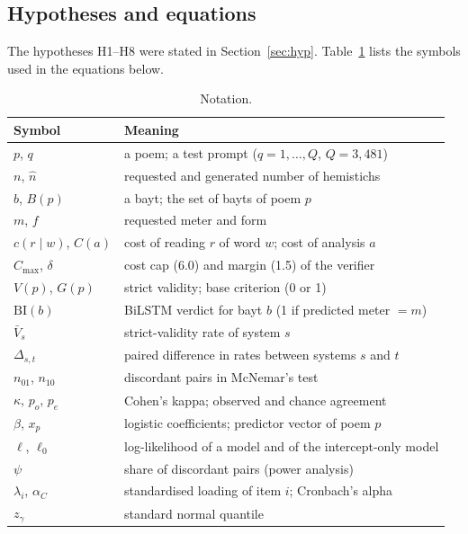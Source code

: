 \subsection{Hypotheses and equations}
\label{sec:eq}
The hypotheses H1--H8 were stated in Section~\ref{sec:hyp}. Table~\ref{tab:notation} lists the symbols used in the
equations below.

\begin{table}[t]
\centering
\caption{Notation.}
\label{tab:notation}
\footnotesize
\begin{tabularx}{\columnwidth}{@{}l X@{}}
\toprule
Symbol & Meaning \\
\midrule
$p$, $q$ & a poem; a test prompt ($q = 1,\dots,Q$, $Q = 3{,}481$) \\
$n$, $\hat{n}$ & requested and generated number of hemistichs \\
$b$, $B(p)$ & a bayt; the set of bayts of poem $p$ \\
$m$, $f$ & requested meter and form \\
$c(r \mid w)$, $C(a)$ & cost of reading $r$ of word $w$; cost of analysis $a$ \\
$C_{\max}$, $\delta$ & cost cap (6.0) and margin (1.5) of the verifier \\
$V(p)$, $G(p)$ & strict validity; base criterion (0 or 1) \\
$\mathrm{BI}(b)$ & BiLSTM verdict for bayt $b$ (1 if predicted meter $=m$) \\
$\bar{V}_s$ & strict-validity rate of system $s$ \\
$\Delta_{s,t}$ & paired difference in rates between systems $s$ and $t$ \\
$n_{01}$, $n_{10}$ & discordant pairs in McNemar's test \\
$\kappa$, $p_o$, $p_e$ & Cohen's kappa; observed and chance agreement \\
$\beta$, $x_p$ & logistic coefficients; predictor vector of poem $p$ \\
$\ell$, $\ell_0$ & log-likelihood of a model and of the intercept-only model \\
$\psi$ & share of discordant pairs (power analysis) \\
$\lambda_i$, $\alpha_C$ & standardised loading of item $i$; Cronbach's alpha \\
$z_{\gamma}$ & standard normal quantile \\
\bottomrule
\end{tabularx}
\end{table}

